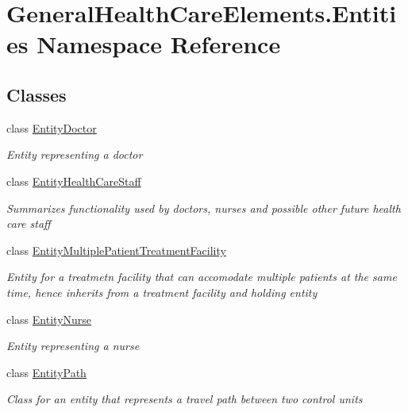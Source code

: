 \hypertarget{namespace_general_health_care_elements_1_1_entities}{}\section{General\+Health\+Care\+Elements.\+Entities Namespace Reference}
\label{namespace_general_health_care_elements_1_1_entities}
\subsection*{Classes}
\begin{DoxyCompactItemize}
\item 
class \hyperlink{class_general_health_care_elements_1_1_entities_1_1_entity_doctor}{Entity\+Doctor}
\begin{DoxyCompactList}\small\item\em Entity representing a doctor \end{DoxyCompactList}\item 
class \hyperlink{class_general_health_care_elements_1_1_entities_1_1_entity_health_care_staff}{Entity\+Health\+Care\+Staff}
\begin{DoxyCompactList}\small\item\em Summarizes functionality used by doctors, nurses and possible other future health care staff \end{DoxyCompactList}\item 
class \hyperlink{class_general_health_care_elements_1_1_entities_1_1_entity_multiple_patient_treatment_facility}{Entity\+Multiple\+Patient\+Treatment\+Facility}
\begin{DoxyCompactList}\small\item\em Entity for a treatmetn facility that can accomodate multiple patients at the same time, hence inherits from a treatment facility and holding entity \end{DoxyCompactList}\item 
class \hyperlink{class_general_health_care_elements_1_1_entities_1_1_entity_nurse}{Entity\+Nurse}
\begin{DoxyCompactList}\small\item\em Entity representing a nurse \end{DoxyCompactList}\item 
class \hyperlink{class_general_health_care_elements_1_1_entities_1_1_entity_path}{Entity\+Path}
\begin{DoxyCompactList}\small\item\em Class for an entity that represents a travel path between two control units \end{DoxyCompactList}\item 

\end{DoxyCompactItemize}
